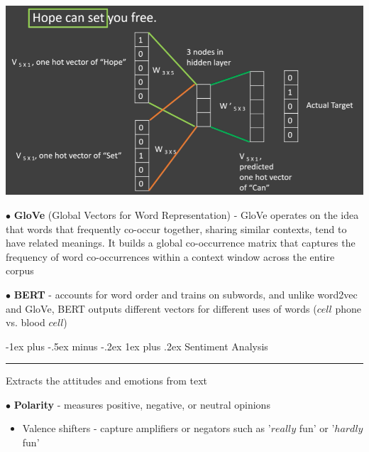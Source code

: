 \documentclass[letterpaper, 10.5pt,landscape]{article}
\makeatletter
\renewcommand{\subsubsection}{\@startsection{subsubsection}{3}{0mm}%
                                {-1ex plus -.5ex minus -.2ex}%
                                {1ex plus .2ex}%
                                {\normalfont\small\bfseries}}
\makeatother
\begin{document}
\begin{multicols*}{3}
\vspace{-5pt}
\begin{center}
    \begin{minipage}{1\linewidth}
    \includegraphics[width=\textwidth]{figures/nlp_CBOW.png}
    \end{minipage}
\end{center}
\vspace{-5pt}



\vspace{3pt}
$\bullet$ \textbf{GloVe} (Global Vectors for Word Representation) - GloVe operates on the idea that words that frequently co-occur together, sharing similar contexts, tend to have related meanings. It builds a global co-occurrence matrix that captures the frequency of word co-occurrences within a context window across the entire corpus


\vspace{3pt}
$\bullet$ \textbf{BERT} - accounts for word order and trains on subwords, and unlike word2vec and GloVe, BERT outputs different vectors for different uses of words ($cell$ phone vs. blood $cell$)





\subsubsection{Sentiment Analysis}  {\color{teal}\hrule height 0.5pt} \smallskip
Extracts the attitudes and emotions from text

$\bullet$ \textbf{Polarity} - measures positive, negative, or neutral opinions
\begin{itemize}[label={--},leftmargin=4mm]
\vspace{-3pt}
\item Valence shifters - capture amplifiers or negators such as '$really$ fun' or '$hardly$ fun'
\end{itemize}



\end{multicols*}
\end{document}
